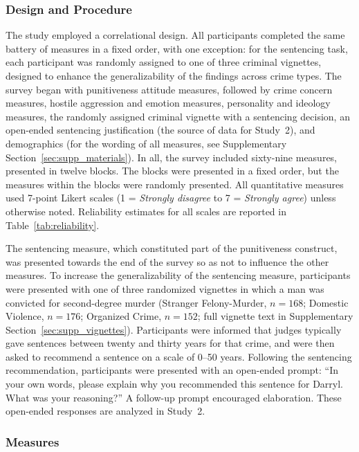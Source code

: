 \subsubsection{Design and Procedure}

The study employed a correlational design. All participants completed the same battery of measures in a fixed order, with one exception: for the sentencing task, each participant was randomly assigned to one of three criminal vignettes, designed to enhance the generalizability of the findings across crime types. The survey began with punitiveness attitude measures, followed by crime concern measures, hostile aggression and emotion measures, personality and ideology measures, the randomly assigned criminal vignette with a sentencing decision, an open-ended sentencing justification (the source of data for Study~2), and demographics (for the wording of all measures, see Supplementary Section~\ref{sec:supp_materials}). In all, the survey included sixty-nine measures, presented in twelve blocks. The blocks were presented in a fixed order, but the measures within the blocks were randomly presented. All quantitative measures used 7-point Likert scales (1 = \textit{Strongly disagree} to 7 = \textit{Strongly agree}) unless otherwise noted. Reliability estimates for all scales are reported in Table~\ref{tab:reliability}.

The sentencing measure, which constituted part of the punitiveness construct, was presented towards the end of the survey so as not to influence the other measures. To increase the generalizability of the sentencing measure, participants were presented with one of three randomized vignettes in which a man was convicted for second-degree murder (Stranger Felony-Murder, $n = 168$; Domestic Violence, $n = 176$; Organized Crime, $n = 152$; full vignette text in Supplementary Section~\ref{sec:supp_vignettes}). Participants were informed that judges typically gave sentences between twenty and thirty years for that crime, and were then asked to recommend a sentence on a scale of 0--50 years. Following the sentencing recommendation, participants were presented with an open-ended prompt: ``In your own words, please explain why you recommended this sentence for Darryl. What was your reasoning?'' A follow-up prompt encouraged elaboration. These open-ended responses are analyzed in Study~2.

\subsubsection{Measures}

